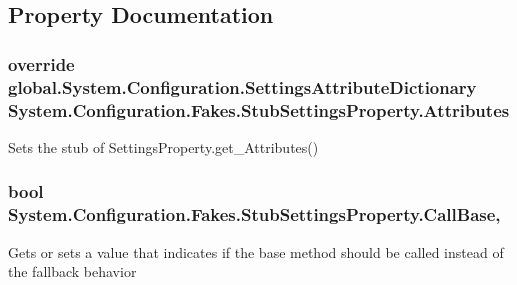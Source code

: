 \subsection{Property Documentation}
\hypertarget{class_system_1_1_configuration_1_1_fakes_1_1_stub_settings_property_a3172977164e9fe8bd1ab33c062bc728a}{
\subsubsection[{Attributes}]{\setlength{\rightskip}{0pt plus 5cm}override global.\-System.\-Configuration.\-Settings\-Attribute\-Dictionary System.\-Configuration.\-Fakes.\-Stub\-Settings\-Property.\-Attributes\hspace{0.3cm}{\ttfamily [get]}}}\label{class_system_1_1_configuration_1_1_fakes_1_1_stub_settings_property_a3172977164e9fe8bd1ab33c062bc728a}


Sets the stub of Settings\-Property.\-get\-\_\-\-Attributes()

\hypertarget{class_system_1_1_configuration_1_1_fakes_1_1_stub_settings_property_a335f2129e0ba72159254b823cd622417}{
\subsubsection[{Call\-Base}]{\setlength{\rightskip}{0pt plus 5cm}bool System.\-Configuration.\-Fakes.\-Stub\-Settings\-Property.\-Call\-Base\hspace{0.3cm}{\ttfamily [get]}, {\ttfamily [set]}}}\label{class_system_1_1_configuration_1_1_fakes_1_1_stub_settings_property_a335f2129e0ba72159254b823cd622417}


Gets or sets a value that indicates if the base method should be called instead of the fallback behavior

